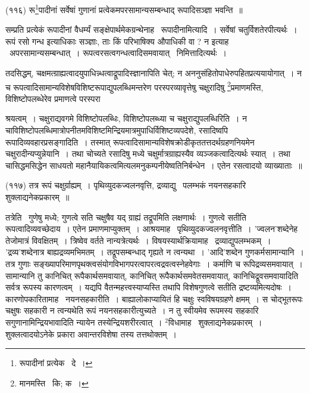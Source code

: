 \documentclass[11pt, openany]{book}
\begin{document}
{\hangindent=2cm {\knu (११६) रू\renewcommand{\thefootnote}{4}\footnote{रूपादीनां प्रत्येक \textendash\ दे~।}पादीनां सर्वेषां गुणानां प्रत्वेकमपरसामान्यसम्बन्धाद् रूपादिसञ्ज्ञा भवन्ति~॥}

सम्प्रति प्रत्येकं रूपादीनां वैधर्म्यं सङ्क्षेपार्थमेकग्रन्थेनाह \textendash\ रूपादीनामित्यादि~। सर्वेषां चतुर्विशतेरपीत्यर्थः~। रूपं रसो गन्ध इत्याधिकाः सञ्ज्ञाः, ताः किं परिभाषिक्य औपाधिकी वा ? न इत्याह \textendash\ अपरसामान्यसम्बन्धात्~। रूपत्वरसत्वगन्धत्वादिसमवायात् \textendash\ निमित्तादित्यर्थः~।

तदसिद्धम्, चक्षमत्ग्राह्यत्वादयुपाधिन्न्धत्वाद्रूपादिस्ज्ञानापिति चेत्; न अननुसंहितोपाधेरुपहितप्रत्ययायोगात्~। न च रूपत्वादिसामान्यविशेषविशिष्टरूपाद्युपलब्धिमन्तरेण परस्परव्यावृत्तेषु चक्षुरादिषु \renewcommand{\thefootnote}{5}\footnote{मानमस्ति \textendash\ कि; क~।}प्रमाणमस्ति, विशिष्टोपलब्धेरेव प्रमाणत्वे परस्परा\textendash

\newpage
\noindent
श्रयत्वम्~। चक्षुराद्यवगमे विशिष्टोपलब्धिः, विशिष्टोपलब्ध्या च चक्षुराद्युपलब्धिरिति~। न चाविशिष्टोपलब्धिमात्रोपनीतमविशिष्टमिन्द्रियमात्रमुपाधिर्विशिष्टव्यपदेशे, रसादिष्वपि रूपादिव्यवहारप्रसङ्गादिति~। तस्मात् रूपत्वादिसामान्यविशेषक्रोडीकृततत्तदर्थग्रहणनियमेन चक्षुरादीन्यप्युन्नेयानि~। तथा चोच्यते रसादिषु मध्ये चक्षुर्मात्रग्राह्यस्यैव व्यञ्जकत्वादित्यर्थः स्यात्~। तथा चासिद्धमसिद्धेन साधयतो महानैयायिकत्वमित्यलमनुकम्पनीयेष्वतिनिर्बन्धेन~। एतेन रसत्वादयो व्याख्याताः~॥

\hangindent=2cm {\knu (११७) तत्र रूपं चक्षुर्ग्राह्यम्~। पृथिव्युदकज्वलनवृत्ति, द्रव्याद्यु \textendash\  पलम्भकं नयनसहकारि शुक्लाद्यनेकप्रकारम्~॥}

{\knu तत्रे}ति \textendash\ गुणेषु मध्ये; गुणत्वे सति चक्षुषैव यद् ग्राह्यं तद्रूपमिति लक्षणार्थः~। गुणत्वे सतीति रूपत्वादिव्यवच्छेदाय~। एतेन प्रमाणमाप्युक्तम्~। आश्रयमाह \textendash\ {\knu पृथिव्युदकज्वलनवृत्तीति}~। 'ज्वलन'शब्देनेह तेजोमात्रं विवक्षितम्~। त्रिष्वेव वर्तते नान्यत्रेत्यर्थः~। विषयस्यार्थक्रियामाह \textendash\ द्रव्याद्युपलम्भकम्~। 'द्रव्य'शब्देनात्र बाह्यद्रव्यमभिमतम्~। तद्रूपसम्बन्धाद् गृह्यते न त्वन्यथा~। 'आदि'शब्देन गुणकर्मसामान्यानि~। तत्र गुणाः सङ्ख्यापरिमाणपृथक्त्वसंयोगविभागपरत्वापरत्वद्रवत्वस्नेहवेगाः~। कर्माणि च रूपिद्रव्यसमवायात्~। सामान्यानि तु कानिचित् रूपैकार्थसमवायात्, कानिचित् रूपैकार्थसमवेतसमवायात्, कानिचिद्रूवसमवायादिति सर्वत्र रूपस्य कारणत्वम्~। यद्यपि वैतन्महत्त्वस्याप्यस्ति तथापि विशेषगुणत्वे सतीति द्रष्टव्यमित्यदोषः~। कारणोपकारितामाह \textendash\ {\knu नयनसहकारीति}~। बाह्यालोकाप्यायितं हि चक्षुः स्वविषयग्रहणे क्षमम्~। स चोद्भूतरूपः चक्षुषः सहकारी न त्वन्यथेति रूपं नयनसहकारीत्युच्यते~। न तु स्वीयमेव रूपमस्य सहकारि सगुणानामिन्द्रियभावादिति न्यायेन तस्येन्द्रियशरीरत्वात्~। ${}^2$विधामाह \textendash\ {\knu शुक्लाद्यनेकप्रकारम्}~। शुक्लत्वादयोऽनेके प्रकारा अवान्तरविशेषा तस्य तत्तथोक्तम्~।

}
\end{document}
